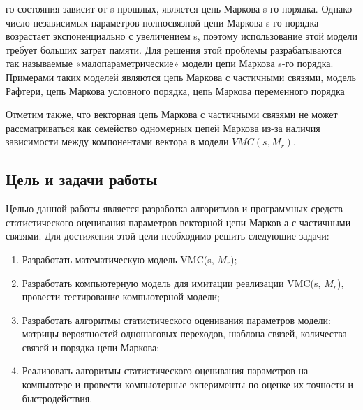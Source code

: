 го состояния зависит от s
прошлых, является цепь Маркова s-го порядка. Однако число независимых
параметров полносвязной цепи Маркова s-го порядка возрастает экспоненциально с
увеличением s, поэтому использование этой модели требует больших затрат памяти. Для решения этой проблемы разрабатываются так называемые «малопараметрические» модели цепи Маркова s-го порядка. Примерами таких моделей являются цепь Маркова с частичными связями, модель Рафтери, цепь Маркова условного порядка, цепь Маркова переменного порядка

Отметим также, что векторная цепь Маркова с частичными связями не может рассматриваться как семейство одномерных цепей Маркова из-за наличия зависимости между компонентами вектора в модели $VMC(s, M_r)$.

\subsection{Цель и задачи работы}
Целью данной  работы является разработка алгоритмов и программных средств статистического оценивания параметров векторной цепи Марков а с частичными связями. Для достижения этой цели необходимо решить следующие задачи:
\begin{enumerate}
\item Разработать математическую модель VMC(s, $M_r$);
\item Разработать компьютерную модель для имитации реализации VMC(s, $M_r$), провести тестирование компьютерной модели;
\item Разработать алгоритмы статистического оценивания параметров модели: матрицы вероятностей одношаговых переходов, шаблона связей, количества связей и порядка цепи Маркова;
\item Реализовать алгоритмы статистического оценивания параметров на компьютере и провести компьютерные экперименты по оценке их точности и быстродействия.
\end{enumerate}
